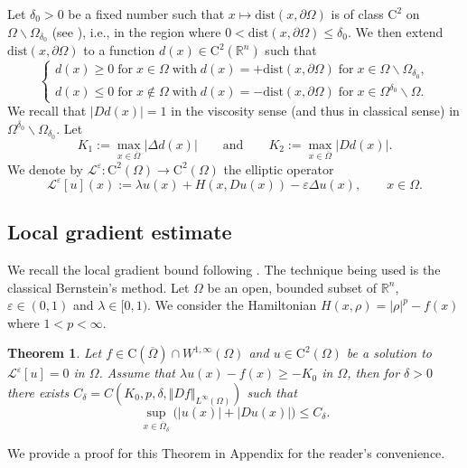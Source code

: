 \documentclass[11pt,reqno]{amsart}
\numberwithin{figure}{section}
\theoremstyle{plain}
\newtheorem{thm}{Theorem}[section]
\theoremstyle{remark}
\numberwithin{equation}{section}
\newcommand{\R}{\mathbb{R}}
\newcommand{\rmC}{\mathrm{C}}
\begin{document}
\noindent Let $\delta_0>0$ be a fixed number such that $x\mapsto \mathrm{dist}(x,\partial\Omega)$ is of class $\mathrm{C}^2$ on $\Omega\backslash \Omega_{\delta_0}$ (see \cite{gilbarg_elliptic_2001}), i.e., in the region where $0<\mathrm{dist}(x,\partial\Omega) \leq \delta_0$. We then extend $\mathrm{dist}(x,\partial\Omega)$ to a function $d(x)\in \mathrm{C}^2(\mathbb{R}^n)$ such that 
\begin{equation}\label{e:distance_def}
    \begin{cases}
    d(x)\geq 0\;\text{for}\;x\in\Omega\;\text{with}\;d(x) = +\mathrm{dist}(x,\partial\Omega)\;\text{for}\;x\in \Omega\backslash \Omega_{\delta_0},\\
    d(x)\leq 0\;\text{for}\;x\notin \Omega\;\text{with}\;d(x) = -\mathrm{dist}(x,\partial\Omega)\;\text{for}\;x\in \Omega^{\delta_0}\backslash \Omega.
    \end{cases}
\end{equation}
We recall that $|D d(x)| = 1$ in the viscosity sense (and thus in classical sense) in $\Omega^{\delta_0}\backslash \Omega_{\delta_0}$. Let 
\begin{equation*}
    K_1 := \max_{x\in \overline{\Omega}} |\Delta d(x)| \qquad\text{and}\qquad K_2 := \max_{x\in \overline{\Omega}} |D d(x)|.
\end{equation*}
\noindent We denote by $\mathcal{L}^\varepsilon:\rmC^2(\Omega)\to \rmC^2(\Omega)$ the elliptic operator
\begin{equation*}
    \mathcal{L}^\varepsilon[u](x) := \lambda u(x) + H(x,Du(x)) - \varepsilon \Delta u(x), \qquad x\in \Omega.
\end{equation*}



\subsection{Local gradient estimate} 
We recall the local gradient bound following \cite[Appendix]{Lasry1989}. The technique being used is the classical Bernstein's method. Let $\Omega$ be an open, bounded subset of $\R^n$, $\varepsilon \in (0,1)$ and $\lambda \in [0,1)$. We consider the Hamiltonian $H(x,\rho) = |\rho|^p - f(x)$ where $1<p < \infty$.

\begin{thm}\label{thm:grad_1} Let $f\in \rmC(\overline{\Omega})\cap W^{1,\infty}(\Omega)$ and $u\in \mathrm{C}^2(\Omega)$ be a solution to $\mathcal{L}^\varepsilon[u] = 0$ in $\Omega$. Assume that $\lambda u(x)-f(x)\geq -K_0$ in $\Omega$, then for $\delta>0$ there exists $C_\delta = C(K_0,p,\delta, \Vert D f\Vert_{L^\infty(\Omega)})$ such that 
\begin{equation*}
    \sup_{x\in \overline{\Omega}_\delta} \Big(|u(x)|+|Du(x)|\Big) \leq C_\delta.
\end{equation*}
\end{thm}
\noindent We provide a proof for this Theorem in Appendix for the reader's convenience.
\end{document}
